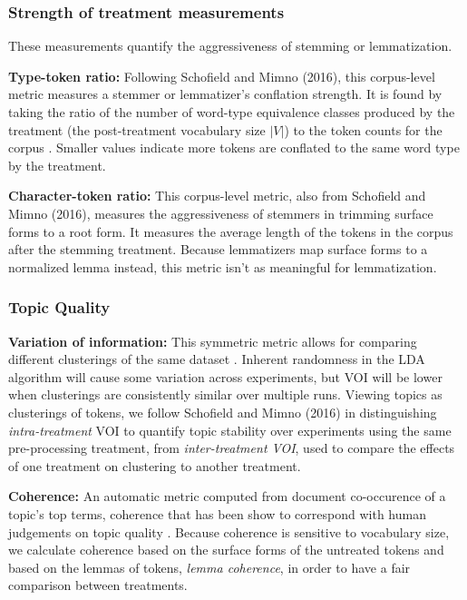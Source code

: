 \documentclass[11pt,a4paper]{article}
\begin{document}
\subsubsection{Strength of treatment measurements}
These measurements quantify the aggressiveness of stemming or lemmatization.

\textbf{Type-token ratio:} Following Schofield and Mimno (2016), this corpus-level metric measures a stemmer or lemmatizer's conflation strength. It is found by taking the ratio of the number of word-type equivalence classes produced by the treatment (the post-treatment vocabulary size $|V|$) to the token counts for the corpus \cite{schofield-mimno-2016-comparing}. Smaller values indicate more tokens are conflated to the same word type by the treatment.

\textbf{Character-token ratio:} This corpus-level metric, also from Schofield and Mimno (2016), measures the aggressiveness of stemmers in trimming surface forms to a root form. It measures the average length of the tokens in the corpus after the stemming treatment. Because lemmatizers map surface forms to a normalized lemma instead, this metric isn't as meaningful for lemmatization.

\subsubsection{Topic Quality}

\textbf{Variation of information:} This symmetric metric allows for comparing different clusterings of the same dataset \cite{Meila2003ComparingCB}. Inherent randomness in the LDA algorithm will cause some variation across experiments, but VOI will be lower when clusterings are consistently similar over multiple runs. Viewing topics as clusterings of tokens, we follow Schofield and Mimno (2016) in distinguishing \textit{intra-treatment} VOI to quantify topic stability over experiments using the same pre-processing treatment,  from \textit{inter-treatment VOI}, used to compare the effects of one treatment on clustering to another treatment.

\textbf{Coherence:} An automatic metric computed from document co-occurence of a topic's top terms, coherence that has been show to correspond with human judgements on topic quality \cite{mimno2011optimizing}. Because coherence is sensitive to vocabulary size, we calculate coherence based on the surface forms of the untreated tokens \cite{schofield-mimno-2016-comparing} and based on the lemmas of tokens, \textit{lemma coherence}, in order to have a fair comparison between treatments.
\end{document}
